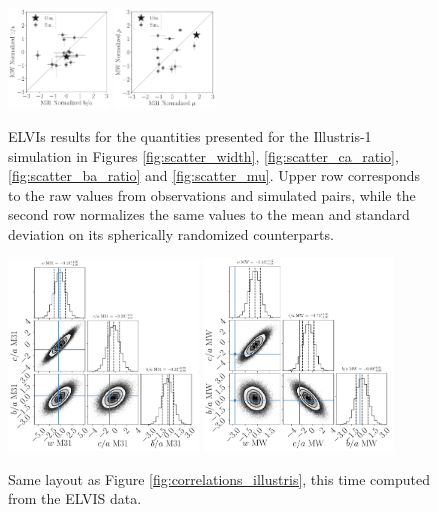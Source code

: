 \documentclass[a4paper,fleqn,usenatbib]{mnras}
\begin{document}
\begin{figure}
\includegraphics[width=0.24\textwidth]{scatter_norm_ranked_elvis_ba_ratio.pdf}
\includegraphics[width=0.24\textwidth]{scatter_norm_ranked_elvis_mu.pdf}
\caption{ELVIs results for the quantities presented for the Illustris-1
  simulation in Figures  \ref{fig:scatter_width},
  \ref{fig:scatter_ca_ratio}, \ref{fig:scatter_ba_ratio} and
  \ref{fig:scatter_mu}.
Upper row corresponds to the raw values from observations and
simulated pairs, while the second row normalizes the same values to
the mean and standard deviation on its spherically randomized
counterparts. 
\label{fig:scatter_elvis}}
\end{figure}

\begin{figure}
\centering
\includegraphics[width=0.45\textwidth]{gaussian_model_elvis_M31.pdf}
\includegraphics[width=0.45\textwidth]{gaussian_model_elvis_MW.pdf}
\caption{
Same layout as Figure \ref{fig:correlations_illustris}, this time
computed from the ELVIS data.
\label{fig:correlations_elvis}}
\end{figure}
\end{document}

